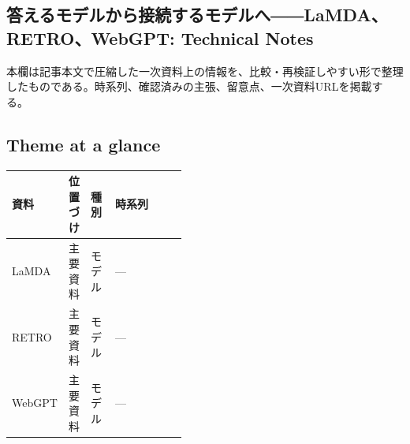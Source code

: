 \subsection*{答えるモデルから接続するモデルへ――LaMDA、RETRO、WebGPT: Technical Notes}
本欄は記事本文で圧縮した一次資料上の情報を、比較・再検証しやすい形で整理したものである。時系列、確認済みの主張、留意点、一次資料URLを掲載する。
\medskip
\subsection*{Theme at a glance}
\begin{center}
\footnotesize
\begin{tabularx}{\linewidth}{@{}p{0.20\linewidth}p{0.10\linewidth}p{0.14\linewidth}X@{}}
\toprule
資料 & 位置づけ & 種別 & 時系列 \\
\midrule
LaMDA & 主要資料 & モデル & — \\
RETRO & 主要資料 & モデル & — \\
WebGPT & 主要資料 & モデル & — \\
\bottomrule
\end{tabularx}
\end{center}
\normalsize

